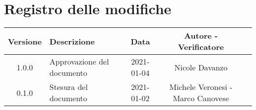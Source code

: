 \section*{Registro delle modifiche}

\begin{center}
	\begin{longtable}{|c|p{5cm}|c|c|c|}
		\hline
		\rowcolor{lighter-grayer}
		\textbf{Versione} & \textbf{Descrizione} & \textbf{Data} & \textbf{Autore - Verificatore} \\
		\hline
		\endfirsthead


		\hline
		1.0.0 & Approvazione del documento & 2021-01-04 & Nicole Davanzo\\
		0.1.0 & Stesura del documento & 2021-01-02 & Michele Veronesi - Marco Canovese \\
		\hline
	\end{longtable}
\end{center}